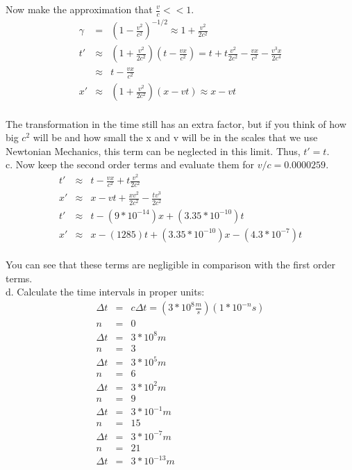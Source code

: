 \documentclass[11pt]{amsart}
\begin{document}
Now make the approximation that $\frac{v}{c}<<1$. \\
\begin{eqnarray*} 
\gamma &=& (1-\frac{v^{2}}{c^{2}})^{-1/2} \approx 1+\frac{v^{2}}{2c^{2}} \\
t' &\approx& (1+\frac{v^{2}}{2c^{2}})(t-\frac{vx}{c^{2}}) = t+t\frac{v^{2}}{2c^{2}}-\frac{vx}{c^{2}}-\frac{v^{3}x}{2c^{4}} \\
&\approx& t-\frac{vx}{c^{2}} \\
x' &\approx& (1+\frac{v^{2}}{2c^{2}})(x-vt) \approx x-vt 
\end{eqnarray*} \\
The transformation in the time still has an extra factor, but if you think of how big $c^{2}$ will be and how small the x and v will be in the scales that we use Newtonian Mechanics, this term can be neglected in this limit. Thus, $t'=t$. \\
c. Now keep the second order terms and evaluate them for $v/c = 0.0000259$. \\
\begin{eqnarray*} 
t' &\approx& t -\frac{vx}{c^{2}}+t\frac{v^{2}}{2c^{2}} \\
x' &\approx& x-vt+\frac{xv^{2}}{2c^{2}}-\frac{tv^{3}}{2c^{2}} \\
t' &\approx& t-(9*10^{-14})x+(3.35*10^{-10})t \\
x' &\approx& x-(1285)t+(3.35*10^{-10})x-(4.3*10^{-7})t
\end{eqnarray*} \\
You can see that these terms are negligible in comparison with the first order terms. \\
d. Calculate the time intervals in proper units: \\
\begin{eqnarray*}
\Delta{t} &=& c\Delta{t} = (3*10^{8}\frac{m}{s})(1*10^{-n}s) \\
n &=& 0 \\
\Delta{t} &=& 3*10^{8}m \\
n &=& 3 \\
\Delta{t} &=& 3*10^{5}m \\
n &=& 6 \\
\Delta{t} &=& 3*10^{2}m \\
n &=& 9 \\
\Delta{t} &=& 3*10^{-1}m \\
n &=& 15 \\
\Delta{t} &=& 3*10^{-7}m \\
n &=& 21 \\
\Delta{t} &=& 3*10^{-13}m 
\end{eqnarray*} \\
\end{document}
